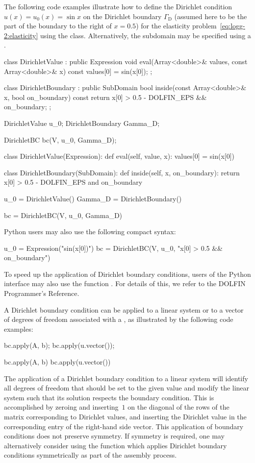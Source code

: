The following code examples illustrate how to define the Dirichlet
condition $u(x) = u_0(x) = \sin x$ on the Dirichlet boundary
$\Gamma_{\mathrm{D}}$ (assumed here to be the part of the boundary
to the right of $x = 0.5$) for the elasticity
problem~\eqref{eq:logg-2:elasticity} using the 
class. Alternatively, the subdomain may be specified using a
.
\begin{c++}
class DirichletValue : public Expression
{
  void eval(Array<double>& values, const Array<double>& x) const
  {
    values[0] = sin(x[0]);
  }
};

class DirichletBoundary : public SubDomain
{
  bool inside(const Array<double>& x, bool on_boundary) const
  {
    return x[0] > 0.5 - DOLFIN_EPS && on_boundary;
  }
};

DirichletValue u_0;
DirichletBoundary Gamma_D;

DirichletBC bc(V, u_0, Gamma_D);
\end{c++}
\begin{python}
class DirichletValue(Expression):
    def eval(self, value, x):
        values[0] = sin(x[0])

class DirichletBoundary(SubDomain):
    def inside(self, x, on_boundary):
        return x[0] > 0.5 - DOLFIN_EPS and on_boundary

u_0 = DirichletValue()
Gamma_D = DirichletBoundary()

bc = DirichletBC(V, u_0, Gamma_D)
\end{python}
Python users may also use the following compact syntax:
\begin{python}
u_0 = Expression("sin(x[0])")
bc = DirichletBC(V, u_0, "x[0] > 0.5 && on_boundary")
\end{python}
To speed up the application of Dirichlet boundary conditions, users of the
Python interface may also use the function . For
details of this, we refer to the DOLFIN Programmer's Reference.

A Dirichlet boundary condition can be applied to a linear system or to
a vector of degrees of freedom associated with a , as
illustrated by the following code examples:
\begin{c++}
bc.apply(A, b);
bc.apply(u.vector());
\end{c++}
\begin{python}
bc.apply(A, b)
bc.apply(u.vector())
\end{python}
The application of a Dirichlet boundary condition to a linear system
will identify all degrees of freedom that should be set to the given
value and modify the linear system such that its solution respects the
boundary condition. This is accomplished by zeroing and inserting~$1$
on the diagonal of the rows of the matrix corresponding to Dirichlet
values, and inserting the Dirichlet value in the corresponding entry
of the right-hand side vector. This application of boundary conditions
does not preserve symmetry. If symmetry is required, one may
alternatively consider using the  function which
applies Dirichlet boundary conditions symmetrically as part of the
assembly process.

